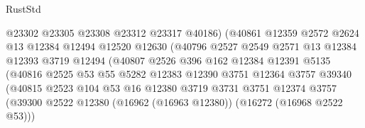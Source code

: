 \begin{lexlean}{RustStd}
\begin{coremodule}
                                  @23302
                                  @23305
                                  @23308
                                  @23312
                                  @23317
                                  @40186)
                                (@40861
                                  @12359
                                  @2572
                                  @2624
                                  @13
                                  @12384
                                  @12494
                                  @12520
                                  @12630
                                  (@40796
                                    @2527
                                    @2549
                                    @2571
                                    @13
                                    @12384
                                    @12393
                                    @3719
                                    @12494
                                    (@40807
                                      @2526
                                      @396
                                      @162
                                      @12384
                                      @12391
                                      @5135
                                      (@40816
                                        @2525
                                        @53
                                        @55
                                        @5282
                                        @12383
                                        @12390
                                        @3751
                                        @12364
                                        @3757
                                        @39340
                                        (@40815
                                          @2523
                                          @104
                                          @53
                                          @16
                                          @12380
                                          @3719
                                          @3731
                                          @3751
                                          @12374
                                          @3757
                                          (@39300
                                            @2522
                                            @12380
                                            (@16962 (@16963 @12380))
                                            (@16272 (@16968 @2522 @53)))

\end{coremodule}
\end{lexlean}
